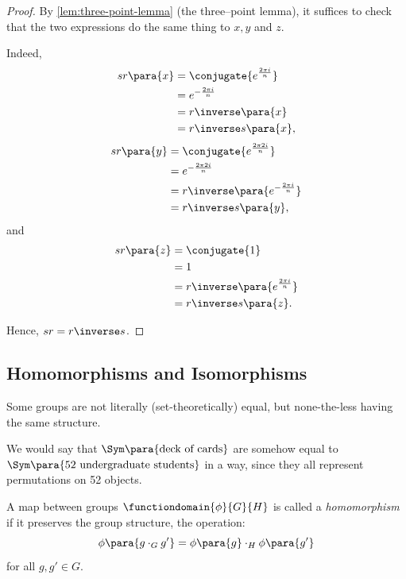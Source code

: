 \begin{proof}
    By \autoref{lem:three-point-lemma} (the three--point lemma), it suffices to check that the two expressions do the same thing to \(x, y\) and \(z\).

    Indeed,
    \begin{align*}
        sr\para{x} &= \conjugate{e^{\frac{2 \pi i}{n}}} \\
        &= e^{-\frac{2 \pi i}{n}} \\
        &= r\inverse \para{x} \\
        &= r\inverse s \para{x},
    \end{align*}
    \begin{align*}
        sr\para{y} &= \conjugate{e^{\frac{2 \pi 2 i}{n}}} \\
        &= e^{-\frac{2 \pi 2 i}{n}} \\
        &= r\inverse \para{e^{- \frac{2 \pi i}{n}}} \\
        &= r\inverse s \para{y},
    \end{align*}
    and
    \begin{align*}
        sr\para{z} &= \conjugate{1} \\
        &= 1 \\
        &= r\inverse \para{e^{\frac{2 \pi i}{n}}} \\
        &= r\inverse s \para{z}.
    \end{align*}

    Hence, \(sr = r\inverse s\).
\end{proof}

\subsection{Homomorphisms and Isomorphisms}
\label{sec:homomorphism-isomorphism}

Some groups are not literally (set-theoretically) equal, but none-the-less having the same structure.

\begin{example}
    We would say that \(\Sym\para{\text{deck of cards}}\) are somehow equal to \(\Sym\para{\text{52 undergraduate students}}\) in a way, since they all represent permutations on 52 objects.
\end{example}

\begin{definition}[Homomorphism]
    \label{def:homomorphism}%
    A map between groups \(\functiondomain{\phi}{G}{H}\) is called a \emph{homomorphism} if it preserves the group structure, the operation:
    \[
        \phi\para{g \cdot_{G} g'} = \phi\para{g} \cdot_{H} \phi\para{g'}
    \]
    for all \(g, g' \in G\).
\end{definition}

